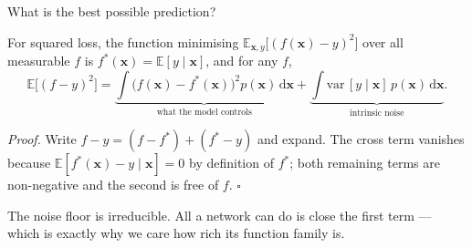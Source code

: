 \documentclass[aspectratio=169, 11pt]{beamer}
\newcommand{\src}[3]{}      %
\begin{document}
\begin{frame}{What is the best possible prediction?}
  \src{bishop2024}{equation}{4.37}
  \src{bishop2024}{equation}{4.39}
  \src{bishop2024}{section}{4.2}
  \begin{theorem}
    {\small For squared loss, the function minimising
    $\mathbb{E}_{\mathbf{x},y}\big[(f(\mathbf{x})-y)^2\big]$ over all
    measurable $f$ is $f^{*}(\mathbf{x})=\mathbb{E}[y\mid\mathbf{x}]$,
    and for any $f$,
    \[
      \mathbb{E}\big[(f-y)^2\big]
      = \underbrace{\int\!\big(f(\mathbf{x})-f^{*}(\mathbf{x})\big)^2
        p(\mathbf{x})\,\mathrm{d}\mathbf{x}}_{\text{what the model
        controls}}
      +
      \underbrace{\int\!\mathrm{var}\,[y\mid\mathbf{x}]\,
        p(\mathbf{x})\,\mathrm{d}\mathbf{x}}_{\text{intrinsic noise}}.
    \]}
  \end{theorem}
  \vspace{-0.3em}
  {\scriptsize
  \emph{Proof.} Write $f-y=(f-f^{*})+(f^{*}-y)$ and expand. The cross
  term vanishes because
  $\mathbb{E}[f^{*}(\mathbf{x})-y\mid\mathbf{x}]=0$ by definition of
  $f^{*}$; both remaining terms are non-negative and the second is
  free of $f$. \hfill$\square$ }
  \vspace{-0.3em}
  \begin{redhighlight}
    {\scriptsize The noise floor is \alert{irreducible}. All a network
    can do is close the first term --- which is exactly why we care how
    rich its function family is.}
  \end{redhighlight}
\end{frame}
\end{document}
